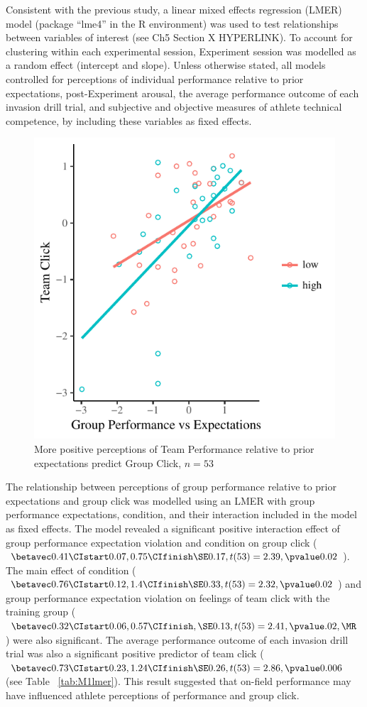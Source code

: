 Consistent with the previous study, a linear mixed effects regression (LMER) model (package ``lme4'' in the R environment) was used to test relationships between variables of interest (see Ch5 Section X HYPERLINK). To account for clustering within each experimental session, Experiment session was modelled as a random effect (intercept and slope).  Unless otherwise stated, all models controlled for perceptions of individual performance relative to prior expectations, post-Experiment arousal, the average performance outcome of each invasion drill trial, and subjective and objective measures of athlete technical competence, by including these variables as fixed effects.





\begin{figure}
    \centering
    \includegraphics[width=0.5\linewidth,keepaspectratio] {images/teamPerfExpClickScatter-1}
    \caption{More positive perceptions of Team Performance relative to prior expectations predict Group Click, $n = 53$}
    \label{fig:teamPerfExpClickScatter}
\end{figure}


The relationship between perceptions of group performance relative to prior expectations and group click was modelled using an LMER with group performance expectations, condition, and their interaction included in the model as fixed effects. The model revealed a significant positive interaction effect of group performance expectation violation and condition on group click ($\betavec 0.41 \CIstart 0.07, 0.75 \CIfinish \SE 0.17, t(53) = 2.39, \pvalue 0.02 $).  The main effect of condition ($\betavec 0.76 \CIstart 0.12, 1.4 \CIfinish \SE 0.33, t(53) = 2.32, \pvalue 0.02 $) and group performance expectation violation on feelings of team click with the training group ($\betavec 0.32 \CIstart 0.06, 0.57 \CIfinish, \SE 0.13, t(53)= 2.41, \pvalue .02, \MR $) were also significant.  The average performance outcome of each invasion drill trial was also a significant positive predictor of team click ($\betavec 0.73 \CIstart 0.23, 1.24 \CIfinish \SE 0.26, t(53)= 2.86, \pvalue 0.006$ (see Table ~\ref{tab:M1lmer}). This result suggested that on-field performance may have influenced athlete perceptions of performance and group click.

